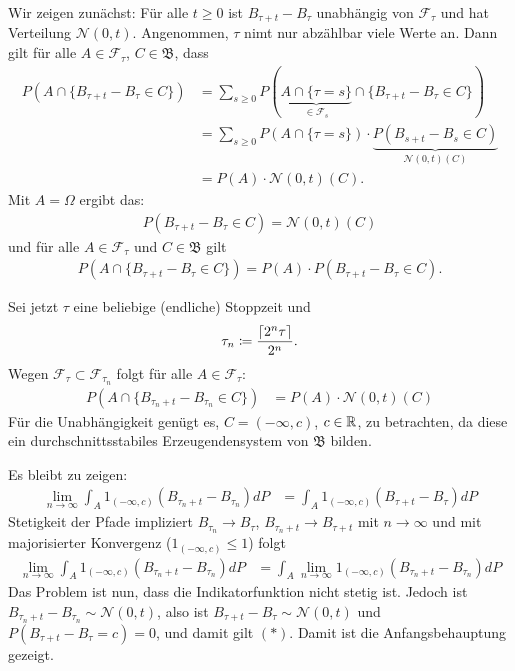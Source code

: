 \documentclass[a4paper,twoside,DIV15,BCOR12mm]{scrbook}
\newcommand{\cF}{\mathcal F}
\newcommand{\borel}{{\mathfrak B}}
\begin{document}
\begin{beweis}
Wir zeigen zunächst: Für alle $t\ge 0$ ist $B_{\tau+t}-B_\tau$ unabhängig von $\cF_\tau$ und hat Verteilung $\mathcal N(0,t)$. Angenommen, $\tau$ nimt nur abzählbar viele Werte an. Dann gilt für alle $A\in \cF_\tau$, $C\in \borel$, dass
\begin{align*}
P(A\cap \{B_{\tau + t}-B_\tau \in C\}) 
&= \sum_{s\ge 0} P(\underbrace{A\cap \{\tau = s\}}_{\in \cF_s} \cap \{B_{\tau +t} - B_\tau \in C\}) \\
&= \sum_{s\ge 0} P(A\cap \{\tau =s\})\cdot\underbrace{ P(B_{s+t}-B_s\in C)}_{\mathcal N(0,t)(C)}\\
&= P(A) \cdot \mathcal N(0,t)(C).
\end{align*}
Mit $A=\Omega$ ergibt das: 
\begin{align*}
P(B_{\tau + t} - B_\tau \in C) = \mathcal N(0,t)(C)
\end{align*}
und für alle $A\in \cF_\tau $ und $C\in \borel$ gilt
\begin{align*}
P(A\cap \{B_{\tau +t} - B_\tau \in C\}) = P(A) \cdot P(B_{\tau +t}-B_\tau\in C).
\end{align*}

Sei jetzt $\tau$ eine beliebige (endliche) Stoppzeit und 
\begin{align*}
\tau_n \da \frac{ \lceil 2^n\tau \rceil}{2^n}.
\end{align*}
Wegen $\cF_\tau\subset\cF_{\tau_n}$ folgt für alle $A\in\cF_\tau$:
\begin{align*}
P(A \cap \{B_{\tau_n+t} - B_{\tau_n}\in C\})  
&= P(A) \cdot \mathcal N(0,t)(C)
\end{align*}
Für die Unabhängigkeit genügt es, $C=(-\infty, c)$, $c\in \mathbb{R}$, zu betrachten, da diese ein durchschnittsstabiles Erzeugendensystem von $\borel$ bilden.

Es bleibt zu zeigen:
\begin{align*}
\lim_{n\to\infty} \int_A 1_{(-\infty,c)} (B_{\tau_n +t}- B_{\tau_n}) dP 
&= \int_A 1_{(-\infty,c)} (B_{\tau+t}-B_\tau) dP \tag{$*$}
\end{align*}
Stetigkeit der Pfade impliziert $B_{\tau_n} \to B_\tau$, $B_{\tau_n+t}\to B_{\tau+t}$ mit $n\to \infty$ und mit majorisierter Konvergenz ($1_{(-\infty,c)} \le 1$) folgt
\begin{align*}
\lim_{n\to\infty} \int_A 1_{(-\infty,c)} (B_{\tau_n +t} - B_{\tau_n}) dP 
&= \int_A \lim_{n\to\infty} 1_{(-\infty,c)} (B_{\tau_n+t} - B_{\tau_n}) dP
\end{align*}
Das Problem ist nun, dass die Indikatorfunktion nicht stetig ist. Jedoch ist $B_{\tau _n+t}-B_{\tau _n}\sim \mathcal N(0,t)$, also ist $B_{\tau +t} - B_{\tau} \sim \mathcal N(0,t)$ und $P(B_{\tau+t}-B_\tau= c) = 0$, und damit gilt $(*)$.
Damit ist die Anfangsbehauptung gezeigt.


\end{beweis}
\end{document}
